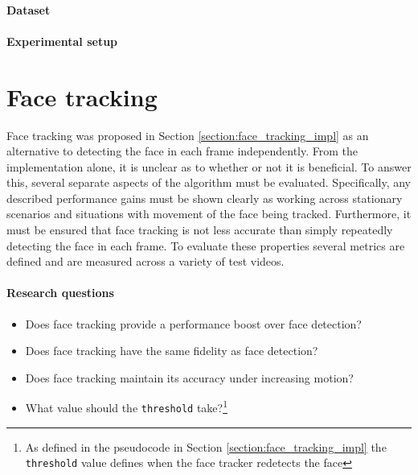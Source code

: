 \paragraph{Dataset}

\paragraph{Experimental setup}


\section{Face tracking}
\label{section:face_tracking}
Face tracking was proposed in Section \ref{section:face_tracking_impl} as an alternative to detecting the face in each frame independently.
From the implementation alone, it is unclear as to whether or not it is beneficial. To answer this, several separate aspects of the algorithm must be evaluated. 
Specifically, any described performance gains must be shown clearly as working across stationary scenarios and situations with movement of the face being tracked. Furthermore, it must be ensured that face tracking is not less accurate than simply repeatedly detecting the face in each frame. To evaluate these properties several metrics are defined and are measured across a variety of test videos.
\paragraph{Research questions}
\begin{itemize}
    \item Does face tracking provide a performance boost over face detection?
    \item Does face tracking have the same fidelity as face detection?
    \item Does face tracking maintain its accuracy under increasing motion?
    \item What value should the \texttt{threshold} take?\footnote{As defined in the pseudocode in Section \ref{section:face_tracking_impl} the \texttt{threshold} value defines when the face tracker redetects the face}
\end{itemize}
